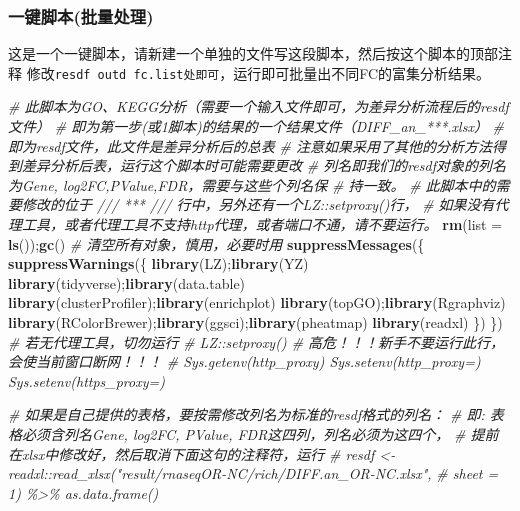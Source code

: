 \documentclass[
]{book}
\newenvironment{Shaded}{\begin{snugshade}}{\end{snugshade}}
\newcommand{\AttributeTok}[1]{\textcolor[rgb]{0.13,0.29,0.53}{#1}}
\newcommand{\CommentTok}[1]{\textcolor[rgb]{0.56,0.35,0.01}{\textit{#1}}}
\newcommand{\FunctionTok}[1]{\textcolor[rgb]{0.13,0.29,0.53}{\textbf{#1}}}
\newcommand{\NormalTok}[1]{#1}
\begin{document}
\subsubsection{一键脚本(批量处理)}\label{ux4e00ux952eux811aux672cux6279ux91cfux5904ux7406}

这是一个一键脚本，请新建一个单独的文件写这段脚本，然后按这个脚本的顶部注释
修改\texttt{resdf\ outd\ fc.list处即可}，运行即可批量出不同FC的富集分析结果。

\begin{Shaded}
\begin{Highlighting}[]
\CommentTok{\# 此脚本为GO、KEGG分析（需要一个输入文件即可，为差异分析流程后的resdf文件）}
\CommentTok{\# 即为第一步(或1脚本)的结果的一个结果文件（DIFF\_an\_***.xlsx）}
\CommentTok{\# 即为resdf文件，此文件是差异分析后的总表}
\CommentTok{\# 注意如果采用了其他的分析方法得到差异分析后表，运行这个脚本时可能需要更改}
\CommentTok{\# 列名即我们的resdf对象的列名为Gene, log2FC,PValue,FDR，需要与这些个列名保}
\CommentTok{\# 持一致。}
\CommentTok{\# 此脚本中的需要修改的位于 /// *** /// 行中，另外还有一个LZ::setproxy()行，}
\CommentTok{\#   如果没有代理工具，或者代理工具不支持http代理，或者端口不通，请不要运行。}
\FunctionTok{rm}\NormalTok{(}\AttributeTok{list =} \FunctionTok{ls}\NormalTok{());}\FunctionTok{gc}\NormalTok{() }\CommentTok{\# 清空所有对象，慎用，必要时用}
\FunctionTok{suppressMessages}\NormalTok{(\{ }\FunctionTok{suppressWarnings}\NormalTok{(\{}
  \FunctionTok{library}\NormalTok{(LZ);}\FunctionTok{library}\NormalTok{(YZ)}
  \FunctionTok{library}\NormalTok{(tidyverse);}\FunctionTok{library}\NormalTok{(data.table)}
  \FunctionTok{library}\NormalTok{(clusterProfiler);}\FunctionTok{library}\NormalTok{(enrichplot)}
  \FunctionTok{library}\NormalTok{(topGO);}\FunctionTok{library}\NormalTok{(Rgraphviz)}
  \FunctionTok{library}\NormalTok{(RColorBrewer);}\FunctionTok{library}\NormalTok{(ggsci);}\FunctionTok{library}\NormalTok{(pheatmap)}
  \FunctionTok{library}\NormalTok{(readxl)}
\NormalTok{\}) \})}
\CommentTok{\# 若无代理工具，切勿运行 }
\CommentTok{\# LZ::setproxy() \# 高危！！！新手不要运行此行，会使当前窗口断网！！！}
\CommentTok{\# Sys.getenv(\textquotesingle{}http\_proxy\textquotesingle{}) Sys.setenv(\textquotesingle{}http\_proxy\textquotesingle{}=\textquotesingle{}\textquotesingle{}) Sys.setenv(\textquotesingle{}https\_proxy\textquotesingle{}=\textquotesingle{}\textquotesingle{})}

\CommentTok{\# 如果是自己提供的表格，要按需修改列名为标准的resdf格式的列名：}
\CommentTok{\# 即: 表格必须含列名Gene, log2FC, PValue, FDR这四列，列名必须为这四个，}
\CommentTok{\# 提前在xlsx中修改好，然后取消下面这句的注释符，运行}
\CommentTok{\# resdf \textless{}{-} readxl::read\_xlsx("result/rnaseqOR{-}NC/rich/DIFF.an\_OR{-}NC.xlsx",}
\CommentTok{\#                  sheet = 1) \%\textgreater{}\% as.data.frame()}


\end{Highlighting}
\end{Shaded}
\end{document}

